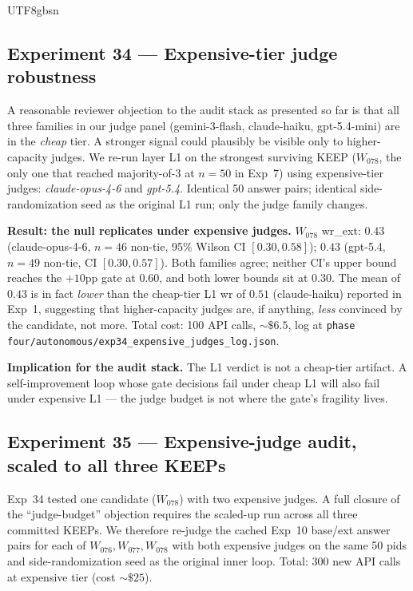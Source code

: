 \documentclass{article}
\begin{document}
\begin{CJK*}{UTF8}{gbsn}
\subsection{Experiment 34 — Expensive-tier judge robustness}
\label{sec:exp34}

A reasonable reviewer objection to the audit stack as presented
so far is that all three families in our judge panel (gemini-3-flash,
claude-haiku, gpt-5.4-mini) are in the \emph{cheap} tier. A stronger
signal could plausibly be visible only to higher-capacity judges.
We re-run layer L1 on the strongest surviving KEEP
(\(W_{078}\), the only one that reached majority-of-3 at \(n=50\)
in Exp~7) using expensive-tier judges: \emph{claude-opus-4-6} and
\emph{gpt-5.4}. Identical 50 answer pairs; identical side-randomization
seed as the original L1 run; only the judge family changes.

\textbf{Result: the null replicates under expensive judges.}
\(W_{078}\) wr\_ext: \(0.43\) (claude-opus-4-6, \(n = 46\) non-tie,
95\% Wilson CI \([0.30, 0.58]\)); \(0.43\) (gpt-5.4, \(n = 49\)
non-tie, CI \([0.30, 0.57]\)). Both families agree; neither CI's
upper bound reaches the \(+10\)pp gate at \(0.60\), and both lower
bounds sit at \(0.30\). The mean of \(0.43\) is in fact
\emph{lower} than the cheap-tier L1 wr of \(0.51\) (claude-haiku)
reported in Exp~1, suggesting that higher-capacity judges are, if
anything, \emph{less} convinced by the candidate, not more. Total
cost: 100 API calls, \(\sim\$6.5\), log at
\texttt{phase four/autonomous/exp34\_expensive\_judges\_log.json}.

\textbf{Implication for the audit stack.} The L1 verdict is not a
cheap-tier artifact. A self-improvement loop whose gate decisions
fail under cheap L1 will also fail under expensive L1 — the judge
budget is not where the gate's fragility lives.

\subsection{Experiment 35 — Expensive-judge audit, scaled to all
three KEEPs}
\label{sec:exp35}

Exp~34 tested one candidate (\(W_{078}\)) with two expensive judges.
A full closure of the ``judge-budget'' objection requires the
scaled-up run across all three committed KEEPs. We therefore
re-judge the cached Exp~10 base/ext answer pairs for each of
\(W_{076}, W_{077}, W_{078}\) with both expensive judges on the
same 50 pids and side-randomization seed as the original inner
loop. Total: 300 new API calls at expensive tier (cost
\({\sim}\$25\)).


\end{CJK*}
\end{document}
